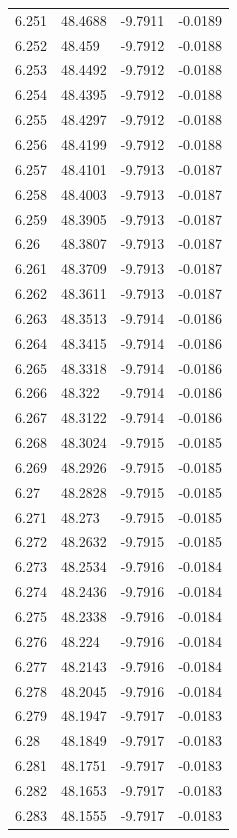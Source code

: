 \begin{tabular}{llll}
6.251 & 48.4688 & -9.7911 & -0.0189 \\
6.252 & 48.459 & -9.7912 & -0.0188 \\
6.253 & 48.4492 & -9.7912 & -0.0188 \\
6.254 & 48.4395 & -9.7912 & -0.0188 \\
6.255 & 48.4297 & -9.7912 & -0.0188 \\
6.256 & 48.4199 & -9.7912 & -0.0188 \\
6.257 & 48.4101 & -9.7913 & -0.0187 \\
6.258 & 48.4003 & -9.7913 & -0.0187 \\
6.259 & 48.3905 & -9.7913 & -0.0187 \\
6.26 & 48.3807 & -9.7913 & -0.0187 \\
6.261 & 48.3709 & -9.7913 & -0.0187 \\
6.262 & 48.3611 & -9.7913 & -0.0187 \\
6.263 & 48.3513 & -9.7914 & -0.0186 \\
6.264 & 48.3415 & -9.7914 & -0.0186 \\
6.265 & 48.3318 & -9.7914 & -0.0186 \\
6.266 & 48.322 & -9.7914 & -0.0186 \\
6.267 & 48.3122 & -9.7914 & -0.0186 \\
6.268 & 48.3024 & -9.7915 & -0.0185 \\
6.269 & 48.2926 & -9.7915 & -0.0185 \\
6.27 & 48.2828 & -9.7915 & -0.0185 \\
6.271 & 48.273 & -9.7915 & -0.0185 \\
6.272 & 48.2632 & -9.7915 & -0.0185 \\
6.273 & 48.2534 & -9.7916 & -0.0184 \\
6.274 & 48.2436 & -9.7916 & -0.0184 \\
6.275 & 48.2338 & -9.7916 & -0.0184 \\
6.276 & 48.224 & -9.7916 & -0.0184 \\
6.277 & 48.2143 & -9.7916 & -0.0184 \\
6.278 & 48.2045 & -9.7916 & -0.0184 \\
6.279 & 48.1947 & -9.7917 & -0.0183 \\
6.28 & 48.1849 & -9.7917 & -0.0183 \\
6.281 & 48.1751 & -9.7917 & -0.0183 \\
6.282 & 48.1653 & -9.7917 & -0.0183 \\
6.283 & 48.1555 & -9.7917 & -0.0183 \\

\end{tabular}
